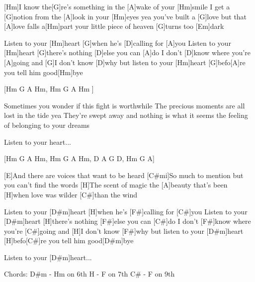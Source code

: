 
[Hm]I know the[G]re's something in the [A]wake of your [Hm]smile
I get a [G]notion from the [A]look in your [Hm]eyes yea
you've built a [G]love but that [A]love falls a[Hm]part
your little piece of heaven [G]turns too [Em]dark

Listen to your [Hm]heart
[G]when he's [D]calling for [A]you
Listen to your [Hm]heart
[G]there's nothing [D]else you can [A]do
I don't [D]know where you're [A]going
and [G]I don't know [D]why
but listen to your [Hm]heart
[G]befo[A]re you tell him good[Hm]bye

[Hm G A Hm, Hm G A Hm ] 

Sometimes you wonder if this fight is worthwhile
The precious moments are all lost in the tide yea
They're swept away and nothing is what it seems
the feeling of belonging to your dreams

Listen to your heart...

[Hm G A Hm, Hm G A Hm, D A G D, Hm G A]
\slpc

[E]And there are voices that want to be heard
[C#mi]So much to mention but you can't find the words
[H]The scent of magic the [A]beauty that's been
[H]when love was wilder [C#]than the wind

Listen to your [D#m]heart
[H]when he's [F#]calling for [C#]you
Listen to your [D#m]heart
[H]there's nothing [F#]else you can [C#]do
I don't [F#]know where you're [C#]going
and [H]I don't know [F#]why
but listen to your [D#m]heart
[H]befo[C#]re you tell him good[D#m]bye

Listen to your [D#m]heart...



Chords: D\#m - Hm on 6th
H - F on 7th
C\# - F on 9th

